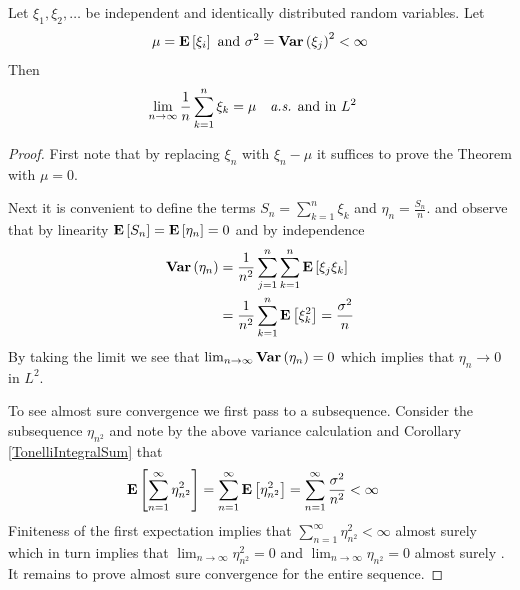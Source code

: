 \begin{thm}\label{SLLNL2} Let $\xi_1, \xi_2, \dots$ be independent and identically
  distributed random variables.  Let
\begin{align*}
\mu = \textbf{E}\left[\xi_i\right] \text { and } \sigma^2 = \textbf{Var} \left (\xi_j \right )^2
< \infty
\end{align*}
Then 
\begin{align*}
\lim_{n \to \infty} \frac{1}{n} \sum_{k=1}^n \xi_k &= \mu \quad \text{\emph{a.s.} and in $L^2$}
\end{align*}
\end{thm}
\begin{proof}
First note that by replacing $\xi_n$ with $\xi_n - \mu$ it suffices to
prove the Theorem with $\mu = 0$.

Next it is convenient to define the terms $S_n =  \sum_{k=1}^n \xi_k$
and $\eta_n = \frac{S_n}{n}$.
and observe that by linearity $\textbf{E}\left[S_n\right] = \textbf{E}\left[\eta_n\right] = 0$ and by
independence 
\begin{align*}
\textbf{Var} \left (\eta_n \right ) &= \frac{1}{n^2} \sum_{j=1}^n \sum_{k=1}^n \textbf{E}\left[\xi_j\xi_k\right] \\
&= \frac{1}{n^2} \sum_{k=1}^n \textbf{E}\left[\xi_k^2\right] = \frac{\sigma^2}{n}
\end{align*}
By taking the limit we see that $\lim_{n\to \infty} \textbf{Var} \left (\eta_n \right ) =
0$ which implies that $\eta_n \to 0$ in $L^2$.  

To see almost sure convergence we first pass to a subsequence.
Consider the subsequence $\eta_{n^2}$ and note by the above
variance calculation and Corollary \ref{TonelliIntegralSum} that 
\begin{align*}
\textbf{E}\left[\sum_{n=1}^\infty \eta_{n^2}^2\right] &= \sum_{n=1}^\infty
\textbf{E}\left[\eta_{n^2}^2\right] = \sum_{n=1}^\infty \frac{\sigma^2}{n^2} < \infty
\end{align*}
Finiteness of the first expectation implies that $\sum_{n = 1}^\infty
\eta_{n^2}^2  < \infty$ almost surely which in turn implies that $\lim_{n \to \infty}
\eta_{n^2}^2 = 0$ and $\lim_{n \to \infty}
\eta_{n^2} = 0$  almost surely .  It remains to prove almost sure
convergence for the entire sequence.  


\end{proof}

